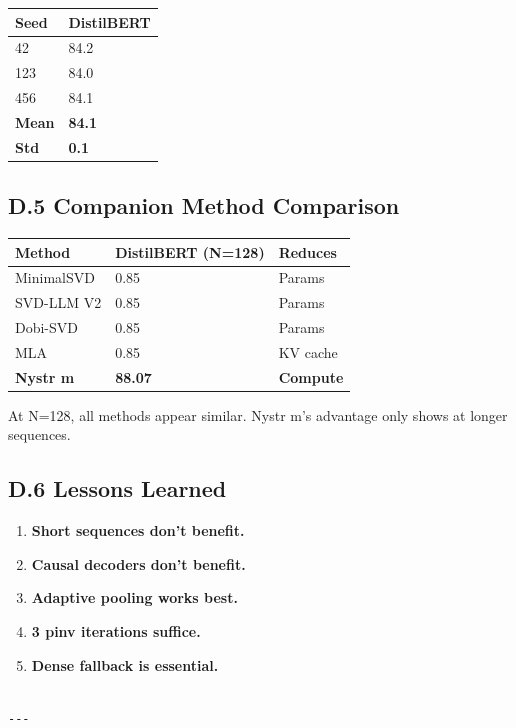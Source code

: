 \begin{table}[H]
\centering
\small
\begin{tabular}{ll}
\toprule
\textbf{Seed} & \textbf{DistilBERT} \\
\midrule
42 & 84.2 \\
123 & 84.0 \\
456 & 84.1 \\
\textbf{Mean} & \textbf{84.1} \\
\textbf{Std} & \textbf{0.1} \\
\bottomrule
\end{tabular}
\end{table}

\subsection{D.5 Companion Method Comparison}

\begin{table}[H]
\centering
\small
\begin{tabular}{lll}
\toprule
\textbf{Method} & \textbf{DistilBERT (N=128)} & \textbf{Reduces} \\
\midrule
MinimalSVD & 0.85 & Params \\
SVD-LLM V2 & 0.85 & Params \\
Dobi-SVD & 0.85 & Params \\
MLA & 0.85 & KV cache \\
\textbf{Nystr m} & \textbf{88.07} & \textbf{Compute} \\
\bottomrule
\end{tabular}
\end{table}

At N=128, all methods appear similar. Nystr m's advantage only shows at 
longer sequences.

\subsection{D.6 Lessons Learned}

\begin{enumerate}
\item \textbf{Short sequences don't benefit.}
\item \textbf{Causal decoders don't benefit.}
\item \textbf{Adaptive pooling works best.}
\item \textbf{3 pinv iterations suffice.}
\item \textbf{Dense fallback is essential.}
\end{enumerate}
\begin{lstlisting}

---
\end{lstlisting}

